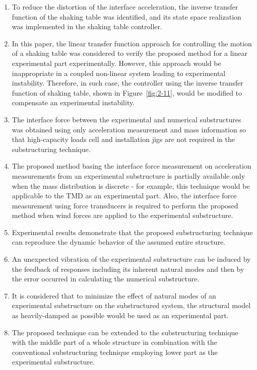 \begin{enumerate}
\item To reduce the distortion of the interface acceleration, the inverse transfer function of the shaking table was identified, and its state space realization was implemented in the shaking table controller.
\item In this paper, the linear transfer function approach for controlling the motion of a shaking table was considered to verify the proposed method for a linear experimental part experimentally. However, this approach would be inappropriate in a coupled non-linear system leading to experimental instability. Therefore, in such case, the controller using the inverse transfer function of shaking table, shown in Figure~\ref{fig:2-11}, would be modified to compensate an experimental instability.
\item The interface force between the experimental and numerical substructures was obtained using only acceleration measurement and mass information so that high-capacity loads cell and installation jigs are not required in the substructuring technique.
\item The proposed method basing the interface force measurement on acceleration measurements from an experimental substructure is partially available only when the mass distribution is discrete - for example, this technique would be applicable to the TMD as an experimental part. Also, the interface force measurement using force transducers is required to perform the proposed method when wind forces are applied to the experimental substructure.
\item Experimental results demonstrate that the proposed substructuring technique can reproduce the dynamic behavior of the assumed entire structure.
\item An unexpected vibration of the experimental substructure can be induced by the feedback of responses including its inherent natural modes and then by the error occurred in calculating the numerical substructure.
\item It is considered that to minimize the effect of natural modes of an experimental substructure on the substructured system, the structural model as heavily-damped as possible would be used as an experimental part.
\item The proposed technique can be extended to the substructuring technique with the middle part of a whole structure in combination with the conventional substructuring technique employing lower part as the experimental substructure.

\end{enumerate}
